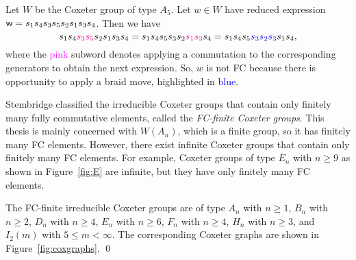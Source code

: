 \begin{example} \label{ex:FC2} Let $W$ be the Coxeter group of type $A_5$. Let $w \in W$ have reduced expression $\mathsf{w} = s_1 s_4 s_3 s_5 s_2 s_1 s_3 s_4$. Then we have 
    $$s_1 s_4 \textcolor{magenta}{s_3 s_5} s_2 s_1 s_3 s_4 = s_1 s_4 s_5 s_3 s_2 \textcolor{magenta}{s_1 s_3} s_4 = s_1 s_4 s_5 \textcolor{blue}{s_3 s_2 s_3} s_1 s_4,$$
    where the \textcolor{magenta}{pink} subword denotes applying a commutation to the corresponding generators to obtain the next expression.
    So, $w$ is not FC because there is opportunity to apply a braid move, highlighted in \textcolor{blue}{blue}.
\end{example}

    Stembridge classified the irreducible Coxeter groups that contain only finitely many fully commutative elements, called the \emph{FC-finite Coxeter groups}.
    This thesis is mainly concerned with $W(A_n)$, which is a finite group, so it has finitely many FC elements. However, there exist infinite Coxeter groups that contain only finitely many FC elements. 
    For example, Coxeter groups of type $E_n$ with $n \geq 9$ as shown in Figure~\ref{fig:E} are infinite, but they have only finitely many FC elements.

\begin{theorem} \label{thm:FCfinite} The FC-finite irreducible Coxeter groups are of type $A_n$ with $n \geq 1$, $B_n$ with $n \geq 2$, $D_n$ with $n \geq 4$, $E_n$ with $n \geq 6$, $F_n$ with $n \geq 4$, $H_n$ with $n \geq 3$, and $I_2(m)$ with $5 \leq m < \infty$. The corresponding Coxeter graphs are shown in Figure~\ref{fig:coxgraphs}. \qed
\end{theorem}


